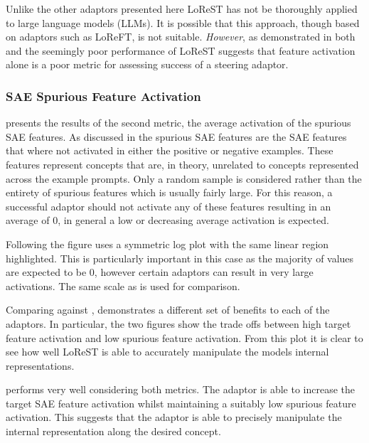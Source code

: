 Unlike the other adaptors presented here LoReST has not be thoroughly applied to large language models (LLMs).
It is possible that this approach, though based on adaptors such as LoReFT, is not suitable.
\emph{However}, as demonstrated in both  and  the seemingly poor performance of LoReST suggests that feature activation alone is a poor metric for assessing success of a steering adaptor.

\subsubsection{SAE Spurious Feature Activation}

 presents the results of the second metric, the average activation of the spurious SAE features.
As discussed in  the spurious SAE features are the SAE features that where not activated in either the positive or negative examples.
These features represent concepts that are, in theory, unrelated to concepts represented across the example prompts.
Only a random sample is considered rather than the entirety of spurious features which is usually fairly large.
For this reason, a successful adaptor should not activate any of these features resulting in an average of 0, in general a low or decreasing average activation is expected.

Following  the figure uses a symmetric log plot with the same linear region highlighted.
This is particularly important in this case as the majority of values are expected to be 0, however certain adaptors can result in very large activations.
The same scale as  is used for comparison.

Comparing against ,  demonstrates a different set of benefits to each of the adaptors.
In particular, the two figures show the trade offs between high target feature activation and low spurious feature activation.
From this plot it is clear to see how well LoReST is able to accurately manipulate the models internal representations.

 performs very well considering both metrics.
The adaptor is able to increase the target SAE feature activation whilst maintaining a suitably low spurious feature activation.
This suggests that the adaptor is able to precisely manipulate the internal representation along the desired concept.

